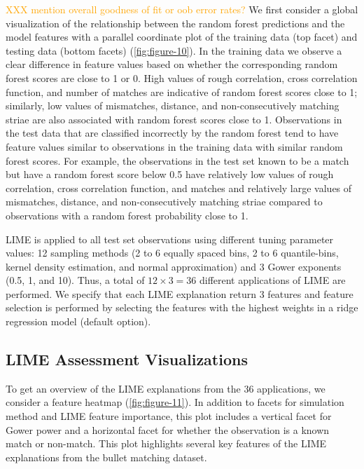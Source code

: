 \documentclass[AMS,STIX2COL]{WileyNJD-v2}\usepackage[]{graphicx}\usepackage[]{color}
\newcommand{\hh}[1]{\textcolor{orange}{#1}}
\begin{document}
\hh{XXX mention overall goodness of fit or oob error rates?}
We first consider a global visualization of the relationship between the random forest predictions and the model features with a parallel coordinate plot of the training data (top facet) and testing data (bottom facets)  (\autoref{fig:figure-10}).  In the training data we observe a clear difference in feature values based on whether the corresponding random forest scores are close to 1 or 0. High values of rough correlation, cross correlation function, and number of matches are indicative of random forest scores close to 1; similarly, low values of mismatches, distance, and non-consecutively matching striae are also associated with random forest scores close to 1.
Observations in the test data that are classified incorrectly by the random forest tend to have feature values similar to observations in the training data with similar random forest scores. For example, the observations in the test set known to be a match but have a random forest score below 0.5 have relatively low values of rough correlation, cross correlation function, and matches and relatively large values of mismatches, distance, and non-consecutively matching striae compared to observations with a random forest probability close to 1.

LIME is applied to all test set observations using different tuning parameter values: 12 sampling methods (2 to 6 equally spaced bins, 2 to 6 quantile-bins, kernel density estimation, and normal approximation) and 3 Gower exponents (0.5, 1, and 10). Thus, a total of $12\times 3=36$ different applications of LIME are performed. We specify that each LIME explanation return 3 features and feature selection is performed by selecting the features with the highest weights in a ridge regression model (default option).







\subsection{LIME Assessment Visualizations} \label{bullet-assess-ex}

To get an overview of the LIME explanations from the 36 applications, we consider a feature heatmap (\autoref{fig:figure-11}). In addition to facets for simulation method and LIME feature importance, this plot includes a vertical facet for Gower power and a horizontal facet for whether the observation is a known match or non-match. This plot highlights several key features of the LIME explanations from the bullet matching dataset.
\end{document}
